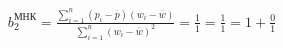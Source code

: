 \documentclass[a4paper,12pt]{article}
\begin{document}
\begin{multline}
  b_2^\text{МНК} =
  \frac{\sum\limits_{i=1}^{n}(p_i-\overline{p})(w_i-\overline{w})}{\sum\limits_{i=1}^{n}(w_i-\overline{w})^2} =
  \frac{1}{1} =
  \frac{1}{1} =
  1 + \frac{0}{1} \\
\end{multline}
\end{document}
